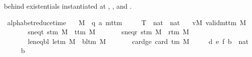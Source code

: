 \begin{isabellebody}
\begin{isamarkuptext}
  behind existentials instantiated at ,
  , and .%
\end{isamarkuptext}\isamarkuptrue%
\isamarkupfalse%
\ alphabet{\isacharunderscore}{\kern0pt}reduce{\isacharunderscore}{\kern0pt}time{\isacharcolon}{\kern0pt}\isanewline
\ \ \ M\ {\isacharcolon}{\kern0pt}{\isacharcolon}{\kern0pt}\ {\isachardoublequoteopen}{\isacharparenleft}{\kern0pt}{\isacharprime}{\kern0pt}q{\isacharcomma}{\kern0pt}\ {\isacharprime}{\kern0pt}a{\isacharparenright}{\kern0pt}\ mttm{\isachardoublequoteclose}\isanewline
\ \ \ \ \ T\ {\isacharcolon}{\kern0pt}{\isacharcolon}{\kern0pt}\ {\isachardoublequoteopen}nat\ {\isasymRightarrow}\ nat{\isachardoublequoteclose}\isanewline
\ \ \ vM{\isacharcolon}{\kern0pt}\ {\isachardoublequoteopen}valid{\isacharunderscore}{\kern0pt}mttm\ M{\isachardoublequoteclose}\isanewline
\ \ \ \ \ \ \ s{\isacharunderscore}{\kern0pt}neq{\isacharunderscore}{\kern0pt}t{\isacharcolon}{\kern0pt}\ {\isachardoublequoteopen}s{\isacharunderscore}{\kern0pt}tm\ M\ {\isasymnoteq}\ t{\isacharunderscore}{\kern0pt}tm\ M{\isachardoublequoteclose}\isanewline
\ \ \ \ \ \ \ s{\isacharunderscore}{\kern0pt}neq{\isacharunderscore}{\kern0pt}r{\isacharcolon}{\kern0pt}\ {\isachardoublequoteopen}s{\isacharunderscore}{\kern0pt}tm\ M\ {\isasymnoteq}\ r{\isacharunderscore}{\kern0pt}tm\ M{\isachardoublequoteclose}\isanewline
\ \ \ \ \ \ \ le{\isacharunderscore}{\kern0pt}neq{\isacharunderscore}{\kern0pt}bl{\isacharcolon}{\kern0pt}\ {\isachardoublequoteopen}le{\isacharunderscore}{\kern0pt}tm\ M\ {\isasymnoteq}\ bl{\isacharunderscore}{\kern0pt}tm\ M{\isachardoublequoteclose}\isanewline
\ \ \ \ \ \ \ card{\isacharunderscore}{\kern0pt}ge{\isacharcolon}{\kern0pt}\ {\isachardoublequoteopen}card\ {\isacharparenleft}{\kern0pt}{\isasymGamma}{\isacharunderscore}{\kern0pt}tm\ M{\isacharparenright}{\kern0pt}\ {\isasymge}\ {}{\isachardoublequoteclose}\isanewline
\ \ \ d\ e\ f\ b\ {\isacharcolon}{\kern0pt}{\isacharcolon}{\kern0pt}\ nat\isanewline
\ \ \ \ \ {\isachardoublequoteopen}b\ {\isasymge}\ {}{\isachardoublequoteclose}\isanewline

\end{isabellebody}
